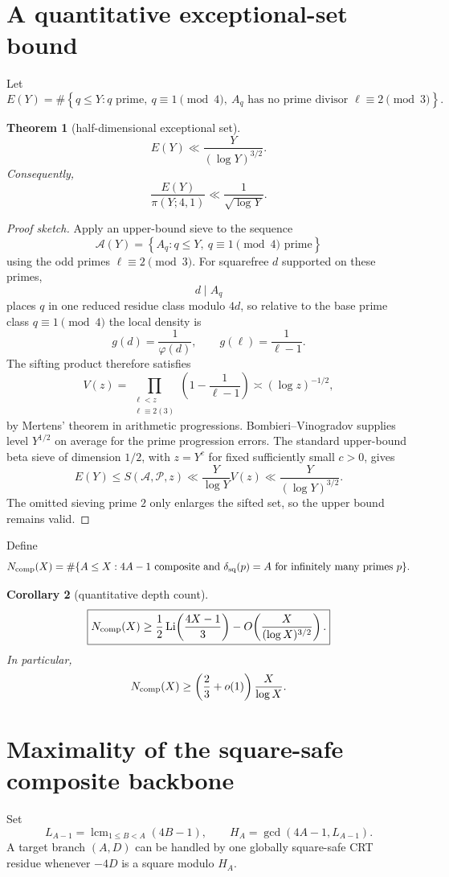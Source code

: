 \documentclass[11pt]{article}
\newtheorem{theorem}{Theorem}
\newtheorem{corollary}[theorem]{Corollary}
\theoremstyle{definition}
\newcommand{\sqdepth}{\delta_{\rm sq}}
\begin{document}
\section{A quantitative exceptional-set bound}
Let
\[
E(Y)=\#\left\{q\le Y:q\text{ prime},\ q\equiv1\pmod4,
\ A_q\text{ has no prime divisor }\ell\equiv2\pmod3\right\}.
\]

\begin{theorem}[half-dimensional exceptional set]\label{thm:exceptional}
\[
\boxed{E(Y)\ll \frac{Y}{(\log Y)^{3/2}}.}
\]
Consequently,
\[
\frac{E(Y)}{\pi(Y;4,1)}\ll \frac1{\sqrt{\log Y}}.
\]
\end{theorem}

\begin{proof}[Proof sketch]
Apply an upper-bound sieve to the sequence
\[
\mathcal A(Y)=\left\{A_q:q\le Y,\ q\equiv1\pmod4\text{ prime}\right\}
\]
using the odd primes $\ell\equiv2\pmod3$. For squarefree $d$ supported on these primes,
\[
d\mid A_q
\]
places $q$ in one reduced residue class modulo $4d$, so relative to the base prime class $q\equiv1\pmod4$ the local density is
\[
g(d)=\frac1{\varphi(d)},\qquad g(\ell)=\frac1{\ell-1}.
\]
The sifting product therefore satisfies
\[
V(z)=\prod_{\substack{\ell<z\\\ell\equiv2(3)}}
\left(1-\frac1{\ell-1}\right)
\asymp (\log z)^{-1/2},
\]
by Mertens' theorem in arithmetic progressions. Bombieri--Vinogradov supplies level $Y^{1/2}$ on average for the prime progression errors. The standard upper-bound beta sieve of dimension $1/2$, with $z=Y^c$ for fixed sufficiently small $c>0$, gives
\[
E(Y)\le S(\mathcal A,\mathcal P,z)
\ll \frac{Y}{\log Y}V(z)
\ll \frac{Y}{(\log Y)^{3/2}}.
\]
The omitted sieving prime $2$ only enlarges the sifted set, so the upper bound remains valid.
\end{proof}

Define
\[
N_{\rm comp}(X)=\#\{A\le X:4A-1\text{ composite and }\sqdepth(p)=A
\text{ for infinitely many primes }p\}.
\]

\begin{corollary}[quantitative depth count]\label{cor:count}
\[
\boxed{
N_{\rm comp}(X)
\ge
\frac12\operatorname{Li}\!\left(\frac{4X-1}{3}\right)
-O\!\left(\frac{X}{(\log X)^{3/2}}\right).
}
\]
In particular,
\[
N_{\rm comp}(X)
\ge
\left(\frac23+o(1)\right)\frac{X}{\log X}.
\]
\end{corollary}

\section{Maximality of the square-safe composite backbone}
Set
\[
L_{A-1}=\operatorname{lcm}_{1\le B<A}(4B-1),\qquad
H_A=\gcd(4A-1,L_{A-1}).
\]
A target branch $(A,D)$ can be handled by one globally square-safe CRT residue whenever $-4D$ is a square modulo $H_A$.
\end{document}
